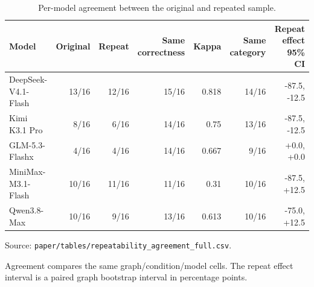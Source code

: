 \begin{table}[htbp]
\centering
\caption{Per-model agreement between the original and repeated sample.}
\label{tab:repeatabilityagreement}
\footnotesize
\setlength{\tabcolsep}{3pt}
\renewcommand{\arraystretch}{1.08}
\begin{tabularx}{\textwidth}{>{\raggedright\arraybackslash}Xrrrrrr}
\toprule
Model & Original & Repeat & Same correctness & Kappa & Same category & Repeat effect 95\% CI \\
\midrule
DeepSeek-V4.1-Flash & 13/16 & 12/16 & 15/16 & 0.818 & 14/16 & -87.5, -12.5 \\
Kimi K3.1 Pro & 8/16 & 6/16 & 14/16 & 0.75 & 13/16 & -87.5, -12.5 \\
GLM-5.3-Flashx & 4/16 & 4/16 & 14/16 & 0.667 & 9/16 & +0.0, +0.0 \\
MiniMax-M3.1-Flash & 10/16 & 11/16 & 11/16 & 0.31 & 10/16 & -87.5, +12.5 \\
Qwen3.8-Max & 10/16 & 9/16 & 13/16 & 0.613 & 10/16 & -75.0, +12.5 \\
\bottomrule
\end{tabularx}
\par\parbox{\linewidth}{\raggedright\footnotesize Source: \texttt{paper/\allowbreak{}tables/\allowbreak{}repeatability\_agreement\_full.csv}.}
\par\parbox{\linewidth}{\raggedright\footnotesize Agreement compares the same graph/condition/model cells. The repeat effect interval is a paired graph bootstrap interval in percentage points.}
\end{table}
